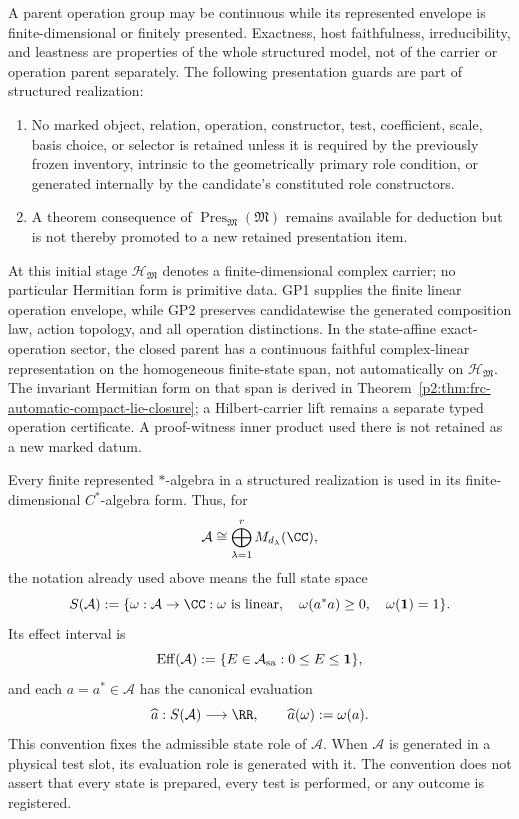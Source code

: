 \documentclass[12pt,a4paper]{article}
\begin{document}
\begin{definition}
A parent operation group may be continuous while its represented envelope is
finite-dimensional or finitely presented.  Exactness, host faithfulness, irreducibility, and leastness are
properties of the whole structured model, not of the carrier or operation
parent separately.  The following presentation guards are part of structured
realization:
\begin{enumerate}[label=(SR\arabic*),leftmargin=2.8em]
\item \label{p2:sr:no-extra-marked-datum}
No marked object, relation, operation, constructor, test, coefficient, scale,
basis choice, or selector is retained unless it is required by the previously
frozen inventory, intrinsic to the geometrically primary role condition, or
generated internally by the candidate's constituted role constructors.
\item A theorem consequence of
\(\operatorname{Pres}_{\mathfrak M}(\mathfrak M)\) remains
available for deduction but is not thereby promoted to a new retained
presentation item.
\end{enumerate}
At this initial stage \(\mathcal H_{\mathfrak M}\) denotes a finite-dimensional
complex carrier; no particular Hermitian form is primitive data.  GP1 supplies
the finite linear operation envelope, while GP2 preserves candidatewise the
generated composition law, action topology, and all operation distinctions.
In the state-affine exact-operation sector, the closed parent has a
continuous faithful complex-linear representation on the homogeneous
finite-state span, not automatically on \(\mathcal H_{\mathfrak M}\).
The invariant Hermitian form on that span is derived in
Theorem~\ref{p2:thm:frc-automatic-compact-lie-closure}; a Hilbert-carrier
lift remains a separate typed operation certificate.  A proof-witness inner
product used there is not retained as a new marked datum.
\end{definition}

\begin{definition}
\label{p2:def:standard-finite-state-space}
Every finite represented \(*\)-algebra in a structured realization is used in
its finite-dimensional \(C^*\)-algebra form.  Thus, for
\[
 \mathcal A\cong\bigoplus_{\lambda=1}^{r}M_{d_\lambda}(\CC),
\]
the notation already used above means the full state space
\[
 S(\mathcal A)
 :=\{\omega:\mathcal A\to\CC:
       \omega\text{ is linear},\quad
       \omega(a^*a)\ge0,\quad
       \omega(\mathbf1)=1\}.
\]
Its effect interval is
\[
 \operatorname{Eff}(\mathcal A)
 :=\{E\in\mathcal A_{\rm sa}:0\le E\le\mathbf1\},
\]
and each \(a=a^*\in\mathcal A\) has the canonical evaluation
\[
 \widehat a:S(\mathcal A)\longrightarrow\RR,
 \qquad \widehat a(\omega):=\omega(a).
\]
This convention fixes the admissible state role of \(\mathcal A\).  When
\(\mathcal A\) is generated in a physical test slot, its evaluation role is
generated with it.  The convention does not assert that every state is
prepared, every test is performed, or any outcome is registered.
\end{definition}
\end{document}
